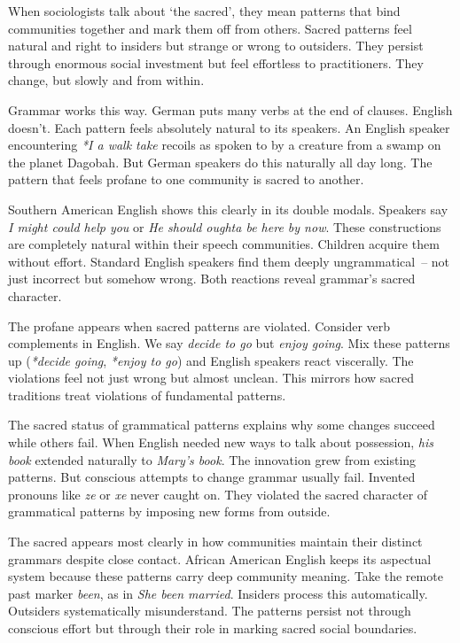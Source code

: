 When sociologists talk about `the sacred', they mean patterns that bind communities together and mark them off from others. Sacred patterns feel natural and right to insiders but strange or wrong to outsiders. They persist through enormous social investment but feel effortless to practitioners. They change, but slowly and from within.

Grammar works this way. German puts many verbs at the end of clauses. English doesn't. Each pattern feels absolutely natural to its speakers. An English speaker encountering \textit{*I a walk take} recoils as spoken to by a creature from a swamp on the planet Dagobah. But German speakers do this naturally all day long. The pattern that feels profane to one community is sacred to another.

Southern American English shows this clearly in its double modals. Speakers say \textit{I might could help you} or \textit{He should oughta be here by now}. These constructions are completely natural within their speech communities. Children acquire them without effort. Standard English speakers find them deeply ungrammatical~-- not just incorrect but somehow wrong. Both reactions reveal grammar's sacred character.

The profane appears when sacred patterns are violated. Consider verb complements in English. We say \textit{decide to go} but \textit{enjoy going}. Mix these patterns up (\textit{*decide going}, \textit{*enjoy to go}) and English speakers react viscerally. The violations feel not just wrong but almost unclean. This mirrors how sacred traditions treat violations of fundamental patterns.

The sacred status of grammatical patterns explains why some changes succeed while others fail. When English needed new ways to talk about possession, \textit{his book} extended naturally to \textit{Mary's book}. The innovation grew from existing patterns. But conscious attempts to change grammar usually fail. Invented pronouns like \textit{ze} or \textit{xe} never caught on. They violated the sacred character of grammatical patterns by imposing new forms from outside.

The sacred appears most clearly in how communities maintain their distinct grammars despite close contact. African American English keeps its aspectual system because these patterns carry deep community meaning. Take the remote past marker \textit{been}, as in \textit{She been married}. Insiders process this automatically. Outsiders systematically misunderstand. The patterns persist not through conscious effort but through their role in marking sacred social boundaries.

